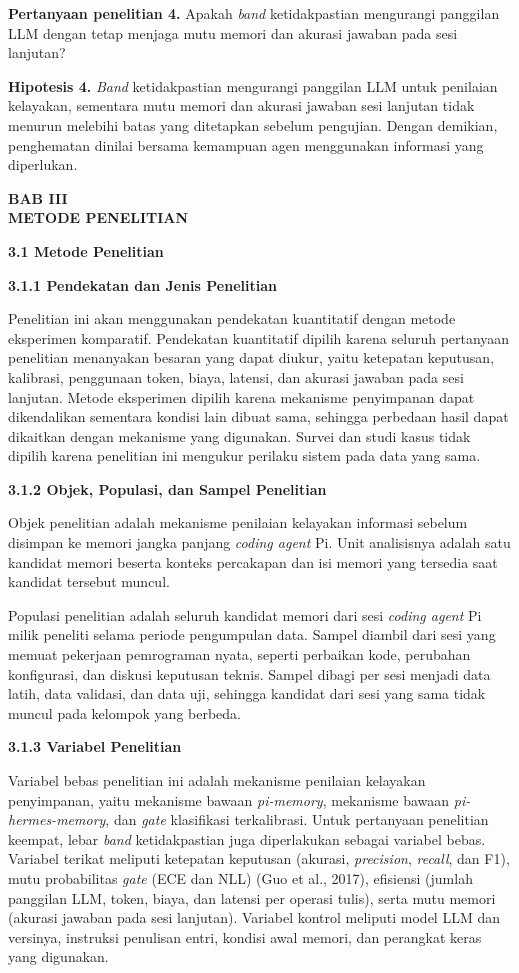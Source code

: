 \documentclass[12pt,a4paper]{article}
\newcommand{\asing}[1]{\textit{#1}}
\newcommand{\pim}{\textit{pi-memory}}
\newcommand{\phm}{\textit{pi-hermes-memory}}
\newcommand{\bab}[3]{%
  \clearpage\phantomsection\label{#3}%
  \begin{center}\large\bfseries BAB #1\\[0.2em] #2\end{center}\vspace{0.8em}}
\newcommand{\subbab}[2]{%
  \par\vspace{0.8em}\phantomsection\label{#2}%
  \noindent\textbf{#1}\par\nopagebreak\vspace{0.3em}}
\newcommand{\subsubbab}[2]{%
  \par\vspace{0.5em}\phantomsection\label{#2}%
  \noindent\textbf{#1}\par\nopagebreak\vspace{0.2em}}
\begin{document}
\textbf{Pertanyaan penelitian 4.} Apakah \asing{band} ketidakpastian mengurangi panggilan LLM dengan tetap menjaga mutu memori dan akurasi jawaban pada sesi lanjutan?

\textbf{Hipotesis 4.} \asing{Band} ketidakpastian mengurangi panggilan LLM untuk penilaian kelayakan, sementara mutu memori dan akurasi jawaban sesi lanjutan tidak menurun melebihi batas yang ditetapkan sebelum pengujian. Dengan demikian, penghematan dinilai bersama kemampuan agen menggunakan informasi yang diperlukan.

\bab{III}{METODE PENELITIAN}{sec:bab3}

\subbab{3.1 Metode Penelitian}{sec:3.1}

\subsubbab{3.1.1 Pendekatan dan Jenis Penelitian}{sec:3.1.1}

Penelitian ini akan menggunakan pendekatan kuantitatif dengan metode eksperimen komparatif. Pendekatan kuantitatif dipilih karena seluruh pertanyaan penelitian menanyakan besaran yang dapat diukur, yaitu ketepatan keputusan, kalibrasi, penggunaan token, biaya, latensi, dan akurasi jawaban pada sesi lanjutan. Metode eksperimen dipilih karena mekanisme penyimpanan dapat dikendalikan sementara kondisi lain dibuat sama, sehingga perbedaan hasil dapat dikaitkan dengan mekanisme yang digunakan. Survei dan studi kasus tidak dipilih karena penelitian ini mengukur perilaku sistem pada data yang sama.

\subsubbab{3.1.2 Objek, Populasi, dan Sampel Penelitian}{sec:3.1.2}

Objek penelitian adalah mekanisme penilaian kelayakan informasi sebelum disimpan ke memori jangka panjang \asing{coding agent} Pi. Unit analisisnya adalah satu kandidat memori beserta konteks percakapan dan isi memori yang tersedia saat kandidat tersebut muncul.

Populasi penelitian adalah seluruh kandidat memori dari sesi \asing{coding agent} Pi milik peneliti selama periode pengumpulan data. Sampel diambil dari sesi yang memuat pekerjaan pemrograman nyata, seperti perbaikan kode, perubahan konfigurasi, dan diskusi keputusan teknis. Sampel dibagi per sesi menjadi data latih, data validasi, dan data uji, sehingga kandidat dari sesi yang sama tidak muncul pada kelompok yang berbeda.

\subsubbab{3.1.3 Variabel Penelitian}{sec:3.1.3}

Variabel bebas penelitian ini adalah mekanisme penilaian kelayakan penyimpanan, yaitu mekanisme bawaan \pim{}, mekanisme bawaan \phm{}, dan \asing{gate} klasifikasi terkalibrasi. Untuk pertanyaan penelitian keempat, lebar \asing{band} ketidakpastian juga diperlakukan sebagai variabel bebas. Variabel terikat meliputi ketepatan keputusan (akurasi, \asing{precision}, \asing{recall}, dan F1), mutu probabilitas \asing{gate} (ECE dan NLL) (Guo et al., 2017), efisiensi (jumlah panggilan LLM, token, biaya, dan latensi per operasi tulis), serta mutu memori (akurasi jawaban pada sesi lanjutan). Variabel kontrol meliputi model LLM dan versinya, instruksi penulisan entri, kondisi awal memori, dan perangkat keras yang digunakan.
\end{document}

